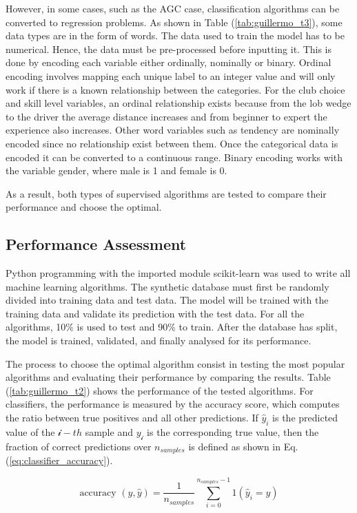\documentclass[11pt,landscape]{article}
\begin{document}
\begin{multicols}{3}
However, in some cases, such as the AGC case, classification algorithms can be
converted to regression problems. As shown in Table (\ref{tab:guillermo_t3}), some data types are in
the form of words. The data used to train the model has to be numerical. Hence,
the data must be pre-processed before inputting it. This is done by encoding
each variable either ordinally, nominally or binary. Ordinal encoding involves
mapping each unique label to an integer value and will only work if there is a
known relationship between the categories. For the club choice and skill level
variables, an ordinal relationship exists because from the lob wedge to the
driver the average distance increases and from beginner to expert the experience
also increases. Other word variables such as tendency are nominally encoded
since no relationship exist between them. Once the categorical data is encoded
it can be converted to a continuous range. Binary encoding works with the
variable gender, where male is 1 and female is 0.

As a result, both types of supervised algorithms are tested to compare their
performance and choose the optimal.

\subsection{Performance Assessment}
Python programming with the imported module scikit-learn was used to write all
machine learning algorithms. The synthetic database must first be randomly
divided into training data and test data. The model will be trained with the
training data and validate its prediction with the test data. For all the
algorithms, 10\% is used to test and 90\% to train. After the database has split,
the model is trained, validated, and finally analysed for its performance.

The process to choose the optimal algorithm consist in testing the most popular
algorithms and evaluating their performance by comparing the results. Table (\ref{tab:guillermo_t2})
shows the performance of the tested algorithms. For classifiers, the performance
is measured by the accuracy score, which computes the ratio between true
positives and all other predictions. If ${\hat{y}}_i$ is the predicted value of
the $\mathcal{i}-th$ sample and $y_\mathcal{i}$ is the corresponding true value,
then the fraction of correct predictions over $n_{samples}$ is defined as shown
in Eq. (\ref{eq:classifier_accuracy}).

\begin{equation}
    \textrm{accuracy } (y, \hat{y})=\frac{1}{n_{samples}} \sum_{i=0}^{n_{samples} - 1} 1(\hat{y}_i=y)
    \label{eq:classifier_accuracy}
\end{equation}


\end{multicols}
\end{document}
